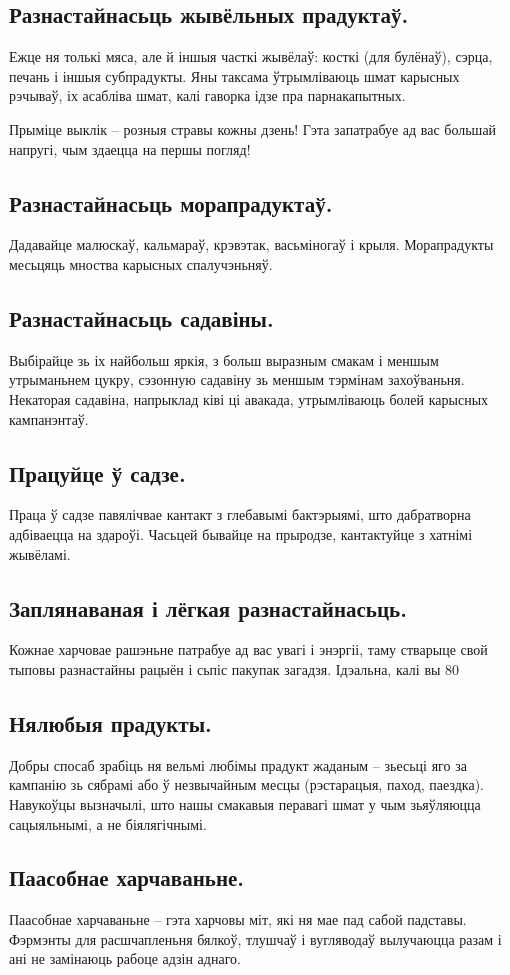 \subsection{Разнастайнасьць жывёльных прадуктаў.}
Ежце ня толькі мяса, але й іншыя часткі жывёлаў: косткі (для булёнаў), сэрца, печань і іншыя субпрадукты. Яны таксама ўтрымліваюць шмат карысных рэчываў, іх асабліва шмат, калі гаворка ідзе пра парнакапытных.

Прыміце выклік – розныя стравы кожны дзень! Гэта запатрабуе ад вас большай напругі, чым здаецца на першы погляд!

\subsection{Разнастайнасьць морапрадуктаў.}
Дадавайце малюскаў, кальмараў, крэвэтак, васьміногаў і крыля. Морапрадукты месьцяць мноства карысных спалучэньняў.

\subsection{Разнастайнасьць садавіны.}
Выбірайце зь іх найбольш яркія, з больш выразным смакам і меншым утрыманьнем цукру, сэзонную садавіну зь меншым тэрмінам захоўваньня. Некаторая садавіна, напрыклад ківі ці авакада, утрымліваюць болей карысных кампанэнтаў.

\subsection{Працуйце ў садзе.}
Праца ў садзе павялічвае кантакт з глебавымі бактэрыямі, што дабратворна адбіваецца на здароўі. Часьцей бывайце на прыродзе, кантактуйце з хатнімі жывёламі.

\subsection{Заплянаваная і лёгкая разнастайнасьць.}
Кожнае харчовае рашэньне патрабуе ад вас увагі і энэргіі, таму стварыце свой тыповы разнастайны рацыён і сьпіс пакупак загадзя. Ідэальна, калі вы 80%

\subsection{Нялюбыя прадукты.}
Добры спосаб зрабіць ня вельмі любімы прадукт жаданым – зьесьці яго за кампанію зь сябрамі або ў незвычайным месцы (рэстарацыя, паход, паездка). Навукоўцы вызначылі, што нашы смакавыя перавагі шмат у чым зьяўляюцца сацыяльнымі, а не біялягічнымі.

\subsection{Паасобнае харчаваньне.}
Паасобнае харчаваньне – гэта харчовы міт, які ня мае пад сабой падставы. Фэрмэнты для расшчапленьня бялкоў, тлушчаў і вугляводаў вылучаюцца разам і ані не замінаюць рабоце адзін аднаго.
